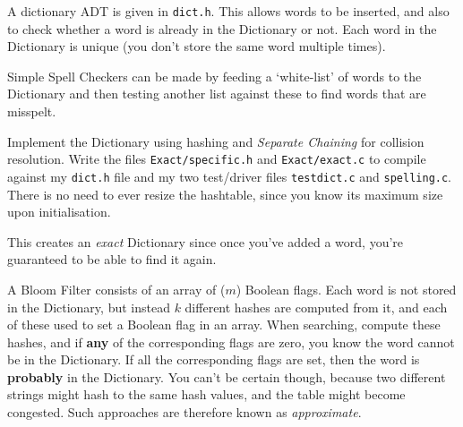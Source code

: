 
A dictionary ADT is given in \verb^dict.h^. This allows words to be
inserted, and also to check whether a word is already in the Dictionary
or not.  Each word in the Dictionary is unique (you don't store the same
word multiple times).

Simple Spell Checkers can be made by feeding a `white-list' of words to the Dictionary
and then testing another list against these to find words that are misspelt.  

\begin{exercise}

Implement the Dictionary using hashing and {\it Separate Chaining}
for collision resolution. Write the files \verb^Exact/specific.h^ and
\verb^Exact/exact.c^ to compile against my \verb^dict.h^ file and my two
test/driver files \verb^testdict.c^ and \verb^spelling.c^.  There is
no need to ever resize the hashtable, since you know its maximum size
upon initialisation.

This creates an {\it exact} Dictionary since once you've added a word,
you're guaranteed to be able to find it again.

\end{exercise}

\noindent
A Bloom Filter
consists of an array of ($m$) Boolean flags.
Each word is not stored in
the Dictionary, but instead $k$ different hashes are computed from it,
and each of these used to set a Boolean flag in an array. When searching,
compute these hashes, and if {\bf any} of the corresponding flags are
zero, you know the word cannot be in the Dictionary. If all the corresponding
flags are set, then the word is {\bf probably} in the Dictionary. You
can't be certain though, because two different strings might hash to the
same hash values, and the table might become congested. Such approaches
are therefore known as {\it approximate}.

